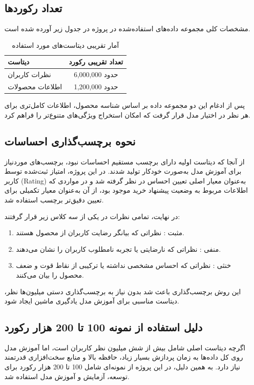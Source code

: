 \subsection{تعداد رکوردها}
مشخصات کلی مجموعه داده‌های استفاده‌شده در پروژه در جدول زیر آورده شده است.

\begin{table}[H]
	\centering
	\caption{آمار تقریبی دیتاست‌های مورد استفاده}
	\label{tab:dataset_statistics}
	
	\begin{tabular}{lc}
		\toprule
		\textbf{دیتاست} & \textbf{تعداد تقریبی رکورد} \\
		\midrule
		
		نظرات کاربران & حدود 6,000,000 \\
		اطلاعات محصولات & حدود 1,200,000 \\
		
		\bottomrule
	\end{tabular}
	
\end{table}

پس از ادغام این دو مجموعه داده بر اساس شناسه محصول، اطلاعات کامل‌تری برای هر نظر در اختیار مدل قرار گرفت که امکان استخراج ویژگی‌های متنوع‌تر را فراهم کرد.
\subsection{نحوه برچسب‌گذاری احساسات}
از آنجا که دیتاست اولیه دارای برچسب مستقیم احساسات نبود، برچسب‌های موردنیاز برای آموزش مدل به‌صورت خودکار تولید شدند. در این پروژه، امتیاز ثبت‌شده توسط کاربر (Rating) به‌عنوان معیار اصلی تعیین احساس در نظر گرفته شد و در مواردی که اطلاعات مربوط به وضعیت پیشنهاد خرید موجود بود، از آن به‌عنوان معیار تکمیلی برای تعیین دقیق‌تر برچسب استفاده شد.

در نهایت، تمامی نظرات در یکی از سه کلاس زیر قرار گرفتند:
\begin{enumerate}
	\item مثبت : نظراتی که بیانگر رضایت کاربران از محصول هستند.
	\item منفی : نظراتی که نارضایتی یا تجربه نامطلوب کاربران را نشان می‌دهند.
	\item خنثی : نظراتی که احساس مشخصی نداشته یا ترکیبی از نقاط قوت و ضعف محصول را بیان می‌کنند.
\end{enumerate}
این روش برچسب‌گذاری باعث شد بدون نیاز به برچسب‌گذاری دستی میلیون‌ها نظر، دیتاست مناسبی برای آموزش مدل یادگیری ماشین ایجاد شود.
\subsection{دلیل استفاده از نمونه 100 تا 200 هزار رکورد}
اگرچه دیتاست اصلی شامل بیش از شش میلیون نظر کاربران است، اما آموزش مدل روی کل داده‌ها به زمان پردازش بسیار زیاد، حافظه بالا و منابع سخت‌افزاری قدرتمند نیاز دارد. به همین دلیل، در این پروژه از نمونه‌ای شامل 100 تا 200 هزار رکورد برای توسعه، آزمایش و آموزش مدل استفاده شد.

